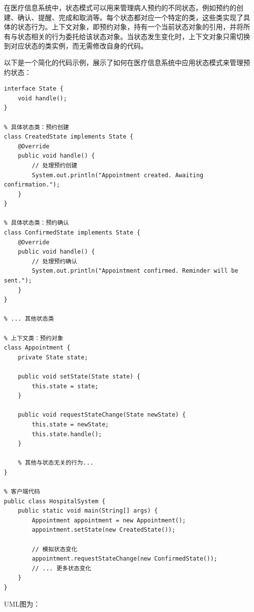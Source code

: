 在医疗信息系统中，状态模式可以用来管理病人预约的不同状态，例如预约的创建、确认、提醒、完成和取消等。每个状态都对应一个特定的类，这些类实现了具体的状态行为。上下文对象，即预约对象，持有一个当前状态对象的引用，并将所有与状态相关的行为委托给该状态对象。当状态发生变化时，上下文对象只需切换到对应状态的类实例，而无需修改自身的代码。

以下是一个简化的代码示例，展示了如何在医疗信息系统中应用状态模式来管理预约状态：
\begin{lstlisting}[caption={状态例子}]
% 状态接口
interface State {
	void handle();
}

% 具体状态类：预约创建
class CreatedState implements State {
	@Override
	public void handle() {
		// 处理预约创建
		System.out.println("Appointment created. Awaiting confirmation.");
	}
}

% 具体状态类：预约确认
class ConfirmedState implements State {
	@Override
	public void handle() {
		// 处理预约确认
		System.out.println("Appointment confirmed. Reminder will be sent.");
	}
}

% ... 其他状态类

% 上下文类：预约对象
class Appointment {
	private State state;
	
	public void setState(State state) {
		this.state = state;
	}
	
	public void requestStateChange(State newState) {
		this.state = newState;
		this.state.handle();
	}
	
	% 其他与状态无关的行为...
}

% 客户端代码
public class HospitalSystem {
	public static void main(String[] args) {
		Appointment appointment = new Appointment();
		appointment.setState(new CreatedState());
		
		// 模拟状态变化
		appointment.requestStateChange(new ConfirmedState());
		// ... 更多状态变化
	}
}
\end{lstlisting}
UML图为：
